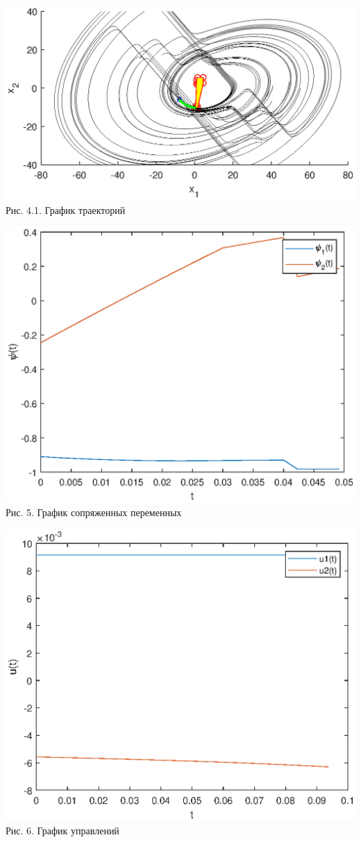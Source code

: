 \documentclass{article}
\theoremstyle{definition}
\begin{document}
\begin{center}
{\includegraphics[width=15cm]{example22.eps}}
{Рис. 4.1. График траекторий}
\end{center}

\begin{center}
{\includegraphics[width=15cm]{pexample2.eps}}
{Рис. 5. График сопряженных переменных}
\end{center}

\begin{center}
  {\includegraphics[width=15cm]{uexample2.eps}}
{Рис. 6. График управлений}
\end{center}
\end{document}
